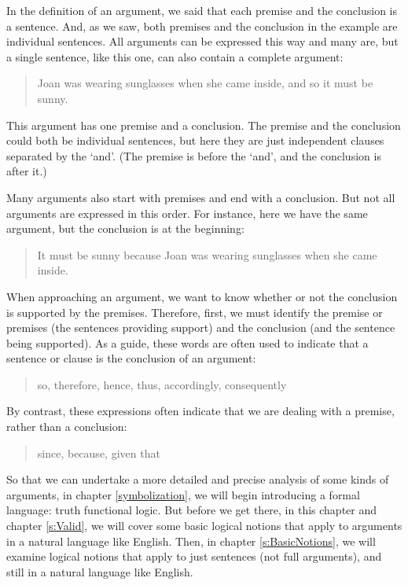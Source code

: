 In the definition of an argument, we said that each premise and the conclusion is a sentence. And, as we saw, both premises and the conclusion in the example are individual sentences. All arguments can be expressed this way and many are, but a single sentence, like this one, can also contain a complete argument:
	\begin{quote}
		Joan was wearing sunglasses when she came inside, and so it must be sunny.
	\end{quote}
This argument has one premise and a conclusion. The premise and the conclusion could both be individual sentences, but here they are just independent clauses separated by the `and'. (The premise is before the `and', and the conclusion is after it.)

Many arguments also start with premises and end with a conclusion. But not all arguments are expressed in this order. For instance, here we have the same argument, but the conclusion is at the beginning:
	\begin{quote}
		It must be sunny because Joan was wearing sunglasses when she came inside.
	\end{quote}

When approaching an argument, we want to know whether or not the conclusion is supported by the premises. Therefore, first, we must identify the premise or premises (the sentences providing support) and the conclusion (and the sentence being supported). As a guide, these words are often used to indicate that a sentence or clause is the conclusion of an argument:
	\begin{quote}
		so, therefore, hence, thus, accordingly, consequently
	\end{quote}
By contrast, these expressions often indicate that we are dealing with a premise, rather than a conclusion:
	\begin{quote}
		since, because, given that
	\end{quote}

So that we can undertake a more detailed and precise analysis of some kinds of arguments, in chapter \ref{symbolization}, we will begin introducing a formal language: truth functional logic. But before we get there, in this chapter and chapter \ref{s:Valid}, we will cover some basic logical notions that apply to arguments in a natural language like English. Then, in chapter \ref{s:BasicNotions},  we will examine logical notions that apply to just sentences (not full arguments), and still in a natural language like English.


